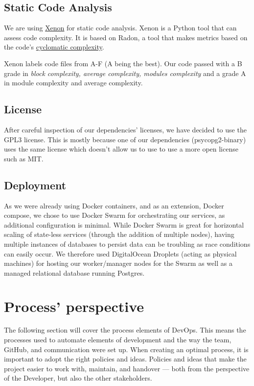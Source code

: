 \documentclass[11pt]{article}
\begin{document}
\subsection{Static Code Analysis}
We are using \href{https://xenon.readthedocs.io/en/stable/}{Xenon} for static code analysis. Xenon is a Python tool that can assess code complexity. It is based on Radon, a tool that makes metrics based on the code's 
\href{https://radon.readthedocs.io/en/latest/intro.html}{cyclomatic complexity}. 

Xenon labels code files from A-F (A being the best). Our code passed with a B grade in \textit{block complexity, average complexity, modules complexity} and a grade A in module complexity and average complexity.

\subsection{License}
After careful inspection of our dependencies' licenses, we have decided to use the GPL3 license. This is mostly because one of our dependencies (psycopg2-binary) uses the same license which doesn't allow us to use to use a more open license such as MIT.

\subsection{Deployment}
As we were already using Docker containers, and as an extension, Docker compose, we chose to use Docker Swarm for orchestrating our services, as additional configuration is minimal. 
While Docker Swarm is great for horizontal scaling of state-less services (through the addition of multiple nodes), having multiple instances of databases to persist data can be troubling as race conditions can easily occur. 
\noindent
We therefore used DigitalOcean Droplets (acting as physical machines) for hosting our worker/manager nodes for the Swarm as well as a managed relational database running Postgres.

\section{Process' perspective}
The following section will cover the process elements of DevOps. This means the processes used to automate elements of development and the way the team, GitHub, and communication were set up. When creating an optimal process, it is important to adopt the right policies and ideas. Policies and ideas that make the project easier to work with, maintain, and handover — both from the perspective of the Developer, but also the other stakeholders.
\end{document}
